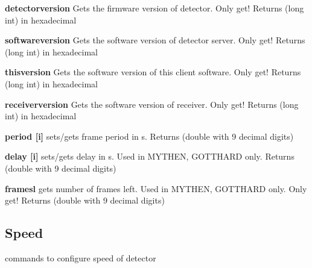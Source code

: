 \begin{DoxyItemize}
\item {\bfseries detectorversion} Gets the firmware version of detector. Only get! {\ttfamily Returns} {\ttfamily }(long int) in hexadecimal
\end{DoxyItemize}


\begin{DoxyItemize}
\item {\bfseries softwareversion} Gets the software version of detector server. Only get! {\ttfamily Returns} {\ttfamily }(long int) in hexadecimal
\end{DoxyItemize}


\begin{DoxyItemize}
\item {\bfseries thisversion} Gets the software version of this client software. Only get! {\ttfamily Returns} {\ttfamily }(long int) in hexadecimal
\end{DoxyItemize}


\begin{DoxyItemize}
\item {\bfseries receiverversion} Gets the software version of receiver. Only get! {\ttfamily Returns} {\ttfamily }(long int) in hexadecimal
\end{DoxyItemize}


\begin{DoxyItemize}
\item {\bfseries period \mbox{[}i\mbox{]}} sets/gets frame period in s. {\ttfamily Returns} {\ttfamily }(double with 9 decimal digits)
\end{DoxyItemize}


\begin{DoxyItemize}
\item {\bfseries delay \mbox{[}i\mbox{]}} sets/gets delay in s. Used in MYTHEN, GOTTHARD only. {\ttfamily Returns} {\ttfamily }(double with 9 decimal digits)
\end{DoxyItemize}


\begin{DoxyItemize}
\item {\bfseries framesl} gets number of frames left. Used in MYTHEN, GOTTHARD only. Only get! {\ttfamily Returns} {\ttfamily }(double with 9 decimal digits)
\end{DoxyItemize}\hypertarget{config_configspeed}{}\subsection{Speed}\label{config_configspeed}
commands to configure speed of detector


